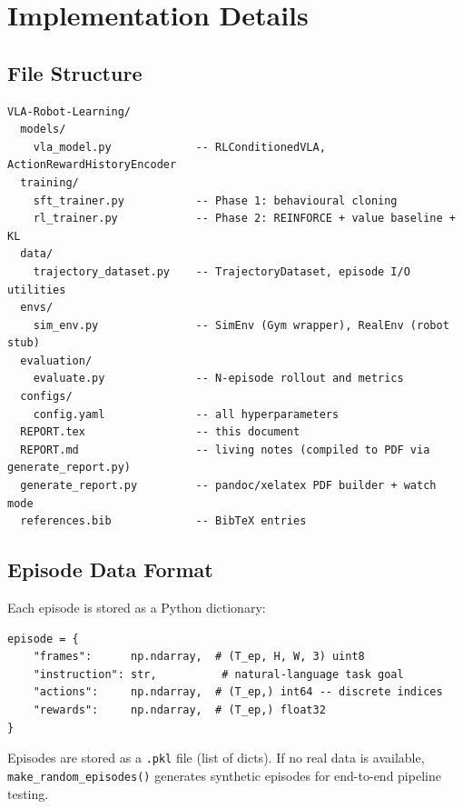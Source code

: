 \documentclass[12pt, a4paper]{article}
\begin{document}
\newpage

\section{Implementation Details}
\label{sec:impl}

\subsection{File Structure}

\begin{lstlisting}[style=Diagram, caption={Project directory layout.}]
VLA-Robot-Learning/
  models/
    vla_model.py             -- RLConditionedVLA, ActionRewardHistoryEncoder
  training/
    sft_trainer.py           -- Phase 1: behavioural cloning
    rl_trainer.py            -- Phase 2: REINFORCE + value baseline + KL
  data/
    trajectory_dataset.py    -- TrajectoryDataset, episode I/O utilities
  envs/
    sim_env.py               -- SimEnv (Gym wrapper), RealEnv (robot stub)
  evaluation/
    evaluate.py              -- N-episode rollout and metrics
  configs/
    config.yaml              -- all hyperparameters
  REPORT.tex                 -- this document
  REPORT.md                  -- living notes (compiled to PDF via generate_report.py)
  generate_report.py         -- pandoc/xelatex PDF builder + watch mode
  references.bib             -- BibTeX entries
\end{lstlisting}

\subsection{Episode Data Format}

Each episode is stored as a Python dictionary:

\begin{lstlisting}[style=Python, caption={Episode dictionary format.}]
episode = {
    "frames":      np.ndarray,  # (T_ep, H, W, 3) uint8
    "instruction": str,          # natural-language task goal
    "actions":     np.ndarray,  # (T_ep,) int64 -- discrete indices
    "rewards":     np.ndarray,  # (T_ep,) float32
}
\end{lstlisting}

Episodes are stored as a \texttt{.pkl} file (list of dicts).
If no real data is available, \texttt{make\_random\_episodes()} generates
synthetic episodes for end-to-end pipeline testing.
\end{document}
